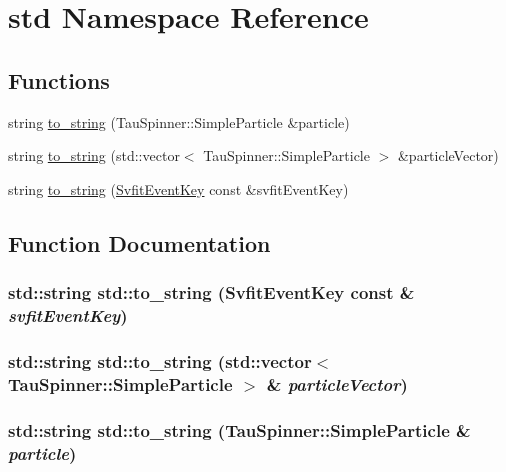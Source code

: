 \hypertarget{namespacestd}{
\section{std Namespace Reference}
\label{namespacestd}
}
\subsection*{Functions}
\begin{DoxyCompactItemize}
\item 
string \hyperlink{namespacestd_aaeff9abdd3862d7a31f6169f105cb9e2}{to\_\-string} (TauSpinner::SimpleParticle \&particle)
\item 
string \hyperlink{namespacestd_ae78ea9768b50ffcf8ad133c6eeb9259e}{to\_\-string} (std::vector$<$ TauSpinner::SimpleParticle $>$ \&particleVector)
\item 
string \hyperlink{namespacestd_a100b654f8c856a5aef7dac3916df8d5d}{to\_\-string} (\hyperlink{classSvfitEventKey}{SvfitEventKey} const \&svfitEventKey)
\end{DoxyCompactItemize}


\subsection{Function Documentation}
\hypertarget{namespacestd_a100b654f8c856a5aef7dac3916df8d5d}{
\subsubsection[{to\_\-string}]{\setlength{\rightskip}{0pt plus 5cm}std::string std::to\_\-string ({\bf SvfitEventKey} const \& {\em svfitEventKey})}}
\label{namespacestd_a100b654f8c856a5aef7dac3916df8d5d}
\hypertarget{namespacestd_ae78ea9768b50ffcf8ad133c6eeb9259e}{
\subsubsection[{to\_\-string}]{\setlength{\rightskip}{0pt plus 5cm}std::string std::to\_\-string (std::vector$<$ TauSpinner::SimpleParticle $>$ \& {\em particleVector})}}
\label{namespacestd_ae78ea9768b50ffcf8ad133c6eeb9259e}
\hypertarget{namespacestd_aaeff9abdd3862d7a31f6169f105cb9e2}{
\subsubsection[{to\_\-string}]{\setlength{\rightskip}{0pt plus 5cm}std::string std::to\_\-string (TauSpinner::SimpleParticle \& {\em particle})}}
\label{namespacestd_aaeff9abdd3862d7a31f6169f105cb9e2}
